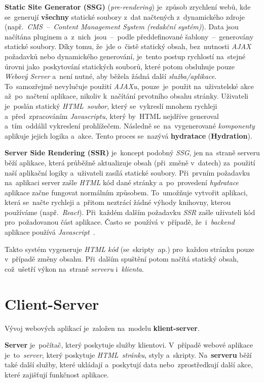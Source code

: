 \documentclass[11pt,a4paper]{report}
\begin{document}
            \textbf{Static Site Generator (SSG)} (\emph{pre-rendering}) je~způsob zrychlení webů, kde se~generují \textbf{všechny} statické soubory z~dat načtených z~dynamického zdroje (např.~\emph{CMS~--~Content Management System (redakční systém)}). Data jsou načítána pluginem a~z~nich~jsou~--~podle předdefinované šablony~--~generovány statické soubory. Díky tomu, že~jde o~čistě statický obsah, bez~nutnosti \emph{AJAX} požadavků nebo dynamického generování, je~tento postup rychlostí na~stejné úrovni jako~poskytování statických souborů, které potom obsluhuje pouze \emph{Webový Server} a~není nutné, aby běžela žádná další \emph{služba/aplikace}. To~samozřejmě nevylučuje použití \emph{AJAXu}, pouze~je~použit na~uživatelské akce až~po~načtení aplikace, nikoliv k~načítání prvotního obsahu stránky. Uživateli je~poslán statický \emph{HTML~soubor}, který se~vykreslí mnohem rychleji a~před~zpracováním \emph{Javascriptu}, který by~HTML nejdříve generoval a~tím~oddálil vykreslení prohlížečem. Následně se~na~vygenerované \emph{komponenty} aplikuje jejich logika a~akce. Tento proces se~nazývá \textbf{hydratace} (\textbf{Hydration}).

            \textbf{Server Side Rendering (SSR)} je~koncept podobný \emph{SSG}, jen na~straně serveru běží aplikace, která průběžně aktualizuje obsah (při~změně v~datech) za~použití naší aplikační logiky a~uživateli zasílá statické soubory. Při~prvním požadavku na~aplikaci server zašle \emph{HTML} kód dané stránky a~po~provedení \emph{hydratace} aplikace začne fungovat normálním způsobem. To~umožňuje vytvořit aplikaci, která se~načte rychleji a~přitom neztrácí žádné výhody knihovny, kterou používáme (např.~\emph{React}). Při~každém dalším požadavku \emph{SSR} zašle uživateli kód pro~požadovanou část aplikace. Často se~používá v~případě, že~i~\emph{backend} aplikace používá \emph{Javascript}~\cite{uc:ssrandssg}.

            Takto systém vygeneruje \emph{HTML kód} (se~skripty~ap.) pro~každou stránku pouze v~případě změny obsahu. Při~dalším spuštění potom načítá statický obsah, což~ušetří výkon na~straně \emph{serveru} i~\emph{klienta}.

        \section{Client-Server}
            Vývoj webových aplikací je~založen na~modelu \textbf{klient-server}.

            \textbf{Server} je~počítač, který poskytuje služby klientovi. V~případě webové aplikace je~to~\emph{server}, který poskytuje \emph{HTML~stránku}, styly a~skripty. Na~\textbf{serveru} běží také další služby, které ukládají a~poskytují data nebo~zprostředkují další akce, které zajišťují funkčnost aplikace.
\end{document}
